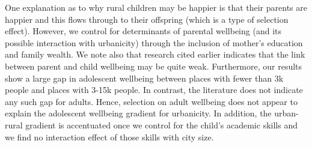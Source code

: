 \documentclass[11pt, letterpaper]{article}
\begin{document}
\begin{spacing}{1.9}

One explanation as to why rural children may be happier is that their parents are
happier and this flows through to their offspring (which is a type of  selection
effect). 
 However, we control for determinants of parental wellbeing (and its possible
interaction with urbanicity) through the inclusion of mother's education and
family wealth. We note also that research cited earlier indicates that the link
between parent and child wellbeing may be quite weak. Furthermore, our results show a large gap in adolescent wellbeing between places with fewer than 3k
people and places with 3-15k people.
 In contrast, the literature does not indicate any such gap for adults. Hence,
selection on adult wellbeing does not appear to explain the adolescent wellbeing gradient for
urbanicity. In addition, the urban-rural gradient is accentuated once we control for the child's academic skills and we find no interaction effect of those skills with city size.


\end{spacing}
\end{document}
